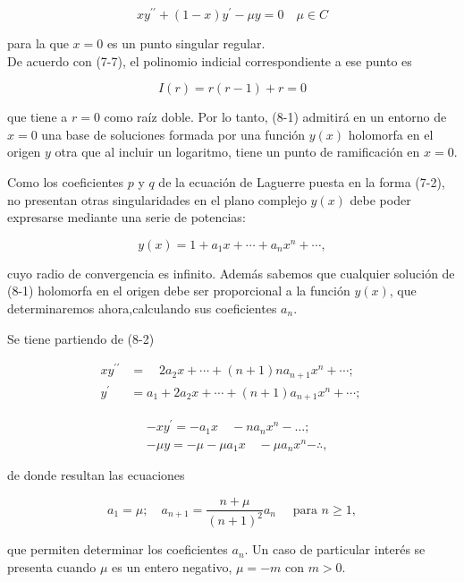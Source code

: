 \documentclass[10pt]{article}
\theoremstyle{plain}
\theoremstyle{definition}
\theoremstyle{remark}
\begin{document}
\begin{equation*}
x y^{\prime \prime}+(1-x) y^{\prime}-\mu y=0 \quad \mu \in C \tag{8-1}
\end{equation*}


para la que $x=0$ es un punto singular regular.\\
De acuerdo con (7-7), el polinomio indicial correspondiente a ese punto es

$$
I(r)=r(r-1)+r=0
$$

que tiene a $r=0$ como raíz doble. Por lo tanto, (8-1) admitirá en un entorno de $x=0$ una base de soluciones formada por una función $y(x)$ holomorfa en el origen $y$ otra que al incluir un logaritmo, tiene un punto de ramificación en $x=0$.

Como los coeficientes $p$ y $q$ de la ecuación de Laguerre puesta en la forma (7-2), no presentan otras singularidades en el plano complejo $y(x)$ debe poder expresarse mediante una serie de potencias:


\begin{equation*}
y(x)=1+a_{1} x+\cdots+a_{n} x^{n}+\cdots, \tag{8-2}
\end{equation*}


cuyo radio de convergencia es infinito. Además sabemos que cualquier solución de (8-1) holomorfa en el origen debe ser proporcional a la función $y(x)$, que determinaremos ahora,calculando sus coeficientes $a_{n}$.

Se tiene partiendo de (8-2)

$$
\begin{aligned}
x y^{\prime \prime} & =\quad 2 a_{2} x+\cdots+(n+1) n a_{n+1} x^{n}+\cdots ; \\
y^{\prime} & =a_{1}+2 a_{2} x+\cdots+(n+1) a_{n+1} x^{n}+\cdots ; ~
\end{aligned}
$$


$$
\begin{aligned}
& -x y^{\prime}=-a_{1} x \quad-n a_{n} x^{n}-\ldots ; \\
& -\mu y=-\mu-\mu a_{1} x \quad-\mu a_{n} x^{n}-\therefore,
\end{aligned}
$$

de donde resultan las ecuaciones


\begin{equation*}
a_{1}=\mu ; \quad a_{n+1}=\frac{n+\mu}{(n+1)^{2}} a_{n} \quad \text { para } n \geqslant 1, \tag{8-3}
\end{equation*}


que permiten determinar los coeficientes $a_{n}$. Un caso de particular interés se presenta cuando $\mu$ es un entero negativo, $\mu=-m$ con $m>0$.
\end{document}
